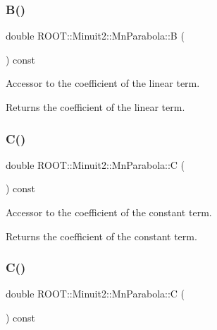 \subsubsection{\texorpdfstring{B()}{B()}\hspace{0.1cm}{\footnotesize\ttfamily [3/3]}}
{\footnotesize\ttfamily double R\+O\+O\+T\+::\+Minuit2\+::\+Mn\+Parabola\+::B (\begin{DoxyParamCaption}{ }\end{DoxyParamCaption}) const\hspace{0.3cm}{\ttfamily [inline]}}

Accessor to the coefficient of the linear term.

\begin{DoxyReturn}{Returns}
the coefficient of the linear term. 
\end{DoxyReturn}
\mbox{\label{classROOT_1_1Minuit2_1_1MnParabola_a9ca632ea018da194e08eb18d4b0059f9}} 
\subsubsection{\texorpdfstring{C()}{C()}\hspace{0.1cm}{\footnotesize\ttfamily [1/3]}}
{\footnotesize\ttfamily double R\+O\+O\+T\+::\+Minuit2\+::\+Mn\+Parabola\+::C (\begin{DoxyParamCaption}{ }\end{DoxyParamCaption}) const\hspace{0.3cm}{\ttfamily [inline]}}

Accessor to the coefficient of the constant term.

\begin{DoxyReturn}{Returns}
the coefficient of the constant term. 
\end{DoxyReturn}
\mbox{\label{classROOT_1_1Minuit2_1_1MnParabola_a9ca632ea018da194e08eb18d4b0059f9}} 
\subsubsection{\texorpdfstring{C()}{C()}\hspace{0.1cm}{\footnotesize\ttfamily [2/3]}}
{\footnotesize\ttfamily double R\+O\+O\+T\+::\+Minuit2\+::\+Mn\+Parabola\+::C (\begin{DoxyParamCaption}{ }\end{DoxyParamCaption}) const\hspace{0.3cm}{\ttfamily [inline]}}

